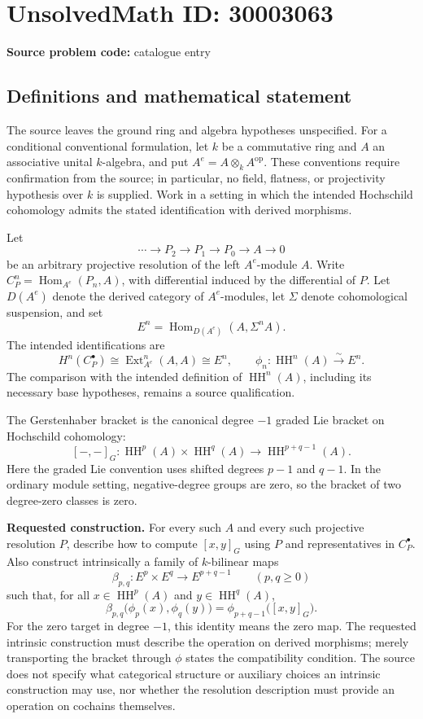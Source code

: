 \documentclass[11pt]{article}
\begin{document}
\section*{UnsolvedMath ID: 30003063}
\textbf{Source problem code:} catalogue entry
\subsection{Definitions and mathematical statement}
The source leaves the ground ring and algebra hypotheses unspecified. For a conditional conventional formulation, let \(k\) be a commutative ring and \(A\) an associative unital \(k\)-algebra, and put \(A^e=A\otimes_k A^{\mathrm{op}}\). These conventions require confirmation from the source; in particular, no field, flatness, or projectivity hypothesis over \(k\) is supplied. Work in a setting in which the intended Hochschild cohomology admits the stated identification with derived morphisms.

Let
\[
\cdots\longrightarrow P_2\longrightarrow P_1\longrightarrow P_0\longrightarrow A\longrightarrow0
\]
be an arbitrary projective resolution of the left \(A^e\)-module \(A\). Write \(C_P^n=\operatorname{Hom}_{A^e}(P_n,A)\), with differential induced by the differential of \(P\). Let \(D(A^e)\) denote the derived category of \(A^e\)-modules, let \(\Sigma\) denote cohomological suspension, and set
\[
E^n=\operatorname{Hom}_{D(A^e)}(A,\Sigma^n A).
\]
The intended identifications are
\[
H^n(C_P^\bullet)\cong\operatorname{Ext}_{A^e}^n(A,A)
\cong E^n,
\qquad
\phi_n:\operatorname{HH}^n(A)\xrightarrow{\sim}E^n.
\]
The comparison with the intended definition of \(\operatorname{HH}^n(A)\), including its necessary base hypotheses, remains a source qualification.

The Gerstenhaber bracket is the canonical degree \(-1\) graded Lie bracket on Hochschild cohomology:
\[
[-,-]_G:\operatorname{HH}^p(A)\times\operatorname{HH}^q(A)
\longrightarrow\operatorname{HH}^{p+q-1}(A).
\]
Here the graded Lie convention uses shifted degrees \(p-1\) and \(q-1\). In the ordinary module setting, negative-degree groups are zero, so the bracket of two degree-zero classes is zero.

\textbf{Requested construction.} For every such \(A\) and every such projective resolution \(P\), describe how to compute \([x,y]_G\) using \(P\) and representatives in \(C_P^\bullet\). Also construct intrinsically a family of \(k\)-bilinear maps
\[
\beta_{p,q}:E^p\times E^q\longrightarrow E^{p+q-1}
\qquad(p,q\geq0)
\]
such that, for all \(x\in\operatorname{HH}^p(A)\) and \(y\in\operatorname{HH}^q(A)\),
\[
\beta_{p,q}\bigl(\phi_p(x),\phi_q(y)\bigr)
=\phi_{p+q-1}\bigl([x,y]_G\bigr).
\]
For the zero target in degree \(-1\), this identity means the zero map. The requested intrinsic construction must describe the operation on derived morphisms; merely transporting the bracket through \(\phi\) states the compatibility condition. The source does not specify what categorical structure or auxiliary choices an intrinsic construction may use, nor whether the resolution description must provide an operation on cochains themselves.
\end{document}
